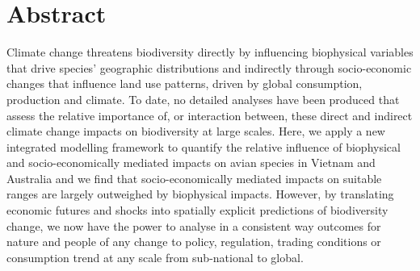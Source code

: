 \documentclass[titlesmallcaps,copyrightpage]{uomthesis}\usepackage[]{graphicx}\usepackage[]{color}
\begin{document}
\section{Abstract}

Climate change threatens biodiversity directly by influencing biophysical variables that drive species’ geographic distributions and indirectly through socio-economic changes that influence land use patterns, driven by global consumption, production and climate. To date, no detailed analyses have been produced that assess the relative importance of, or interaction between, these direct and indirect climate change impacts on biodiversity at large scales. Here, we apply a new integrated modelling framework to quantify the relative influence of biophysical and socio-economically mediated impacts on avian species in Vietnam and Australia and we find that socio-economically mediated impacts on suitable ranges are largely outweighed by biophysical impacts. However, by translating economic futures and shocks into spatially explicit predictions of biodiversity change, we now have the power to analyse in a consistent way outcomes for nature and people of any change to policy, regulation, trading conditions or consumption trend at any scale from sub-national to global.
\end{document}
